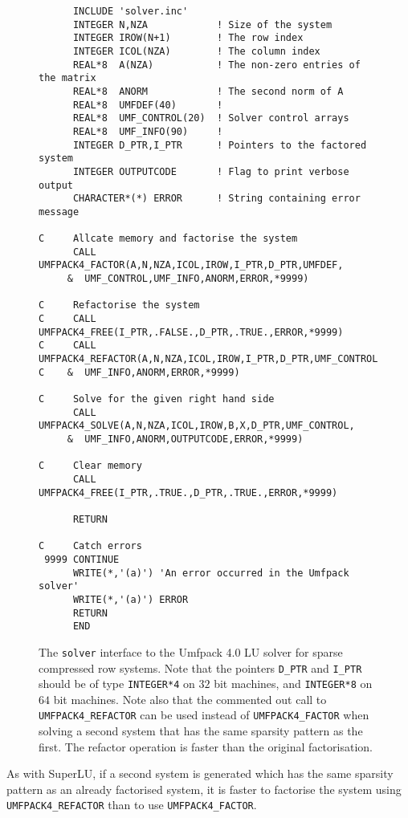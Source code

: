 \begin{figure}[htb]
\begin{small}
\begin{verbatim}
      INCLUDE 'solver.inc'
      INTEGER N,NZA            ! Size of the system
      INTEGER IROW(N+1)        ! The row index
      INTEGER ICOL(NZA)        ! The column index
      REAL*8  A(NZA)           ! The non-zero entries of the matrix
      REAL*8  ANORM            ! The second norm of A
      REAL*8  UMFDEF(40)       !
      REAL*8  UMF_CONTROL(20)  ! Solver control arrays
      REAL*8  UMF_INFO(90)     !
      INTEGER D_PTR,I_PTR      ! Pointers to the factored system
      INTEGER OUTPUTCODE       ! Flag to print verbose output
      CHARACTER*(*) ERROR      ! String containing error message

C     Allcate memory and factorise the system
      CALL UMFPACK4_FACTOR(A,N,NZA,ICOL,IROW,I_PTR,D_PTR,UMFDEF,
     &  UMF_CONTROL,UMF_INFO,ANORM,ERROR,*9999)

C     Refactorise the system
C     CALL UMFPACK4_FREE(I_PTR,.FALSE.,D_PTR,.TRUE.,ERROR,*9999)
C     CALL UMFPACK4_REFACTOR(A,N,NZA,ICOL,IROW,I_PTR,D_PTR,UMF_CONTROL,
C    &  UMF_INFO,ANORM,ERROR,*9999)

C     Solve for the given right hand side
      CALL UMFPACK4_SOLVE(A,N,NZA,ICOL,IROW,B,X,D_PTR,UMF_CONTROL,
     &  UMF_INFO,ANORM,OUTPUTCODE,ERROR,*9999)

C     Clear memory
      CALL UMFPACK4_FREE(I_PTR,.TRUE.,D_PTR,.TRUE.,ERROR,*9999)

      RETURN

C     Catch errors
 9999 CONTINUE
      WRITE(*,'(a)') 'An error occurred in the Umfpack solver'
      WRITE(*,'(a)') ERROR
      RETURN
      END
\end{verbatim}
\end{small}
\caption{\label{f3.2} The {\tt solver} interface to the Umfpack 4.0
  LU solver for sparse compressed row systems. Note that the pointers 
  {\tt D\_PTR} and {\tt I\_PTR} should be of type {\tt INTEGER*4} on $32$ 
  bit machines, and {\tt INTEGER*8} on $64$ bit machines. 
  Note also that the commented out call to {\tt UMFPACK4\_REFACTOR} can be 
  used instead of {\tt UMFPACK4\_FACTOR} when solving a second system that 
  has the same sparsity pattern as the first.
  The refactor operation is faster than the original factorisation.}
\end{figure}

As with SuperLU, if a second system is generated which has the same sparsity 
pattern as an already factorised system, it is faster to factorise the system 
using {\tt UMFPACK4\_REFACTOR} than to use {\tt UMFPACK4\_FACTOR}.


